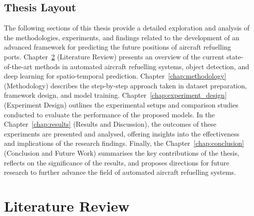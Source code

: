 \documentclass[12pt,oneside]{book} %
\begin{document}
\section{Thesis Layout}
The following sections of this thesis provide a detailed exploration and
analysis of the methodologies, experiments, and findings related to the
development of an advanced framework for predicting the future positions of
aircraft refuelling ports. Chapter~\ref{chap:literature-review} (Literature
Review) presents an overview of the current state-of-the-art methods in
automated aircraft refuelling systems, object detection, and deep learning for
spatio-temporal prediction. Chapter~\ref{chap:methodology} (Methodology)
describes the step-by-step approach taken in dataset preparation, framework
design, and model training. Chapter~\ref{chap:experiment_design} (Experiment
Design) outlines the experimental setups and comparison studies conducted to
evaluate the performance of the proposed models. In the
Chapter~\ref{chap:results} (Results and Discussion), the outcomes of these
experiments are presented and analysed, offering insights into the
effectiveness and implications of the research findings. Finally, the
Chapter~\ref{chap:conclusion} (Conclusion and Future Work) summarises the key
contributions of the thesis, reflects on the significance of the results, and
proposes directions for future research to further advance the field of
automated aircraft refuelling systems.


\chapter{Literature Review}\label{chap:literature-review}
\end{document}
